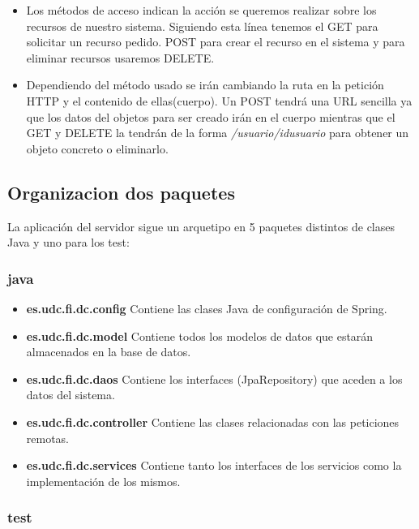 \begin{itemize}
\item Los métodos de acceso indican la acción se queremos realizar sobre los recursos de nuestro sistema. Siguiendo esta línea tenemos el GET para solicitar un recurso pedido. POST para crear el recurso en el sistema y  para eliminar recursos usaremos DELETE. 



\item Dependiendo del método usado se irán cambiando la ruta en la petición HTTP y el contenido de ellas(cuerpo). Un POST tendrá una URL sencilla ya que los datos del objetos para ser creado irán en el cuerpo mientras que el GET y DELETE la tendrán de la forma \textit{ /usuario/{idusuario}} para obtener un objeto concreto o eliminarlo.





 


\end{itemize}

\subsection{Organizacion dos paquetes}
La aplicación del servidor sigue un arquetipo en 5 paquetes distintos de clases Java y uno para los test:
\subsubsection{java}
\begin{itemize}
\item\textbf{ es.udc.fi.dc.config} Contiene las clases Java de configuración de Spring.
\item \textbf{es.udc.fi.dc.model} Contiene todos los modelos de datos que estarán almacenados en la base de datos.
\item \textbf{es.udc.fi.dc.daos} Contiene los interfaces (JpaRepository) que aceden a los datos del sistema.
\item \textbf{es.udc.fi.dc.controller} Contiene las clases relacionadas  con las peticiones remotas.
\item  \textbf{es.udc.fi.dc.services} Contiene tanto los interfaces de los servicios como la implementación de los mismos.


\end{itemize}
\subsubsection{test}

